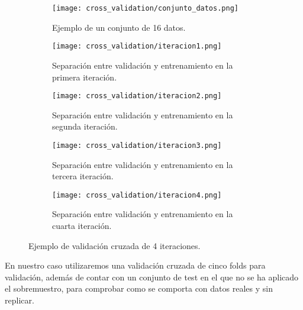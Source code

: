 \begin{figure}[H]
    \centering

	 \begin{subfigure}[b]{\textwidth}
		\centering
		\texttt{[image: cross\_validation/conjunto\_datos.png]}
		\caption{Ejemplo de un conjunto de 16 datos.}
	  \label{fig:ej_16_datos}
   \end{subfigure}
	\vspace{1cm}

	 \begin{subfigure}[b]{\textwidth}
		 \centering
		 \texttt{[image: cross\_validation/iteracion1.png]}
 		 \caption{Separación entre validación y entrenamiento en la primera iteración.}
 	    \label{fig:cv_iteracion1}
	 \end{subfigure}
	 \vspace{1cm}

	\begin{subfigure}[b]{\textwidth}
		 \centering
		 \texttt{[image: cross\_validation/iteracion2.png]}
 		 \caption{Separación entre validación y entrenamiento en la segunda iteración.}
 	    \label{fig:cv_iteracion2}
   \end{subfigure}
	\vspace{1cm}

	\begin{subfigure}[b]{\textwidth}
		 \centering
		 \texttt{[image: cross\_validation/iteracion3.png]}
 		 \caption{Separación entre validación y entrenamiento en la tercera iteración.}
 	    \label{fig:cv_iteracion3}
	\end{subfigure}
	\vspace{1cm}

	\begin{subfigure}[b]{\textwidth}
		 \centering
		 \texttt{[image: cross\_validation/iteracion4.png]}
 		 \caption{Separación entre validación y entrenamiento en la cuarta iteración.}
 	    \label{fig:cv_iteracion4}
	\end{subfigure}

	\caption{Ejemplo de validación cruzada de 4 iteraciones.}
	\label{fig:4-cv-ejemplo}
\end{figure}


En nuestro caso utilizaremos una validación cruzada de cinco folds para validación, además de contar con un conjunto de test en el que no se ha aplicado el sobremuestro, para comprobar como se comporta con datos reales y sin replicar.

